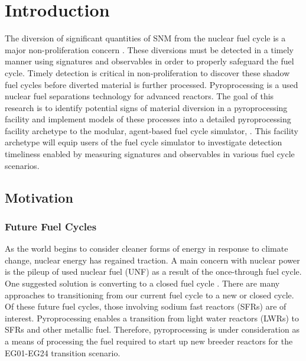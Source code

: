 \chapter[Introduction]{Introduction}
The diversion of significant quantities of \gls{SNM} from the nuclear fuel cycle is a major non-proliferation 
concern \cite{noauthor_serving_2017}. These diversions must be detected in a timely manner using signatures and observables in 
order to properly safeguard the fuel cycle. Timely detection is critical in non-proliferation to discover these shadow fuel cycles
before diverted material is further processed. Pyroprocessing is a used nuclear fuel separations technology for advanced reactors. 
The goal of this research is to identify potential signs of material diversion in a pyroprocessing facility and implement models 
of these processes into a detailed pyroprocessing facility archetype to the modular, agent-based fuel cycle simulator, \Cyclus \cite{huff_fundamental_2016}. This facility archetype will equip users of the \Cyclus fuel cycle simulator to investigate 
detection timeliness enabled by measuring signatures and observables in various fuel cycle scenarios.
\section{Motivation}
\subsection{Future Fuel Cycles}
As the world begins to consider cleaner forms of energy in response to climate change, nuclear energy has regained traction. A main
concern with nuclear power is the pileup of used nuclear fuel (UNF) as a result of the once-through fuel cycle. 
One suggested solution is converting to a closed fuel cycle \cite{wigeland_nuclear_2014}. There are many approaches to transitioning from our current
fuel cycle to a new or closed cycle. Of these future fuel cycles, those involving sodium fast reactors (SFRs) are of interest. 
Pyroprocessing enables a transition from light water reactors (LWRs) to SFRs and other metallic fuel.
Therefore, pyroprocessing is under consideration as a means of processing the fuel required to start up new breeder reactors for
the EG01-EG24 transition scenario.

